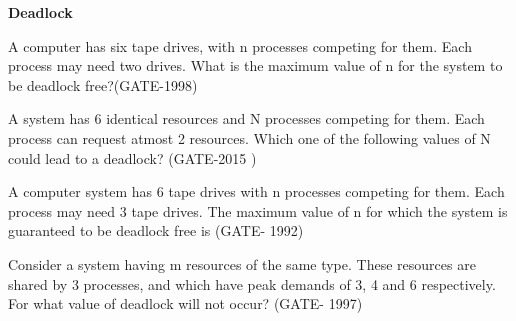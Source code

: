 \centerline{\textbf{ \LARGE Deadlock}}


\begin{questyle}

  \question  A computer has six tape drives, with n processes competing for them. Each process may need two drives.
             What is the maximum value of n for the system to be deadlock free?(GATE-1998)

  \begin{oneparchoices}
  \end{oneparchoices}

  \end{questyle}




\begin{questyle}

  \question  A system has 6 identical resources and N processes competing for them. Each process can request atmost 2 resources. Which one of the following values of N could lead to a deadlock? (GATE-2015 )

  \begin{oneparchoices}
  \end{oneparchoices}

  \end{questyle}




\begin{questyle}

  \question  A computer system has 6 tape drives with n processes competing for them. Each process may need 3 tape drives. The maximum value of n for which the system is guaranteed to be deadlock free is (GATE- 1992)

  \begin{oneparchoices}
  \end{oneparchoices}

  \end{questyle}



\begin{questyle}

  \question  Consider a system having m resources of the same type. These resources are shared by 3 processes, and  which have peak demands of 3, 4 and 6 respectively.  For what value of deadlock will not occur? (GATE- 1997)

  \begin{oneparchoices}
  \end{oneparchoices}

  \end{questyle}



